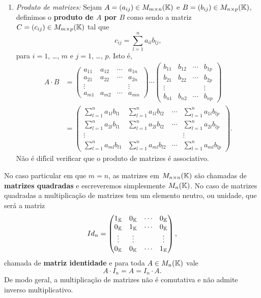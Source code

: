 \begin{enumerate}
	\item \textit{Produto de matrizes:} Sejam $A = (a_{ij}) \in M_{m\times n}(\mathbb{K})$ e $B = (b_{ij}) \in M_{n\times p}(\mathbb{K})$, definimos o \textbf{produto de $A$ por $B$} como sendo a matriz $C = (c_{ij}) \in M_{m\times p}(\mathbb{K})$ tal que
	\[
		c_{ij} = \sum_{l=1}^n a_{il}b_{lj},
	\]
	para $i = 1$, \dots, $m$ e $j = 1$, \dots, $p$. Isto \'e,
	\begin{align*}
		A\cdot B &= \begin{pmatrix}
		a_{11} & a_{12} & \cdots & a_{1n}\\
		a_{21} & a_{22} & \cdots & a_{2n}\\
		\vdots & & & \vdots\\
		a_{m1} & a_{m2} & \cdots & a_{mn}
	\end{pmatrix}\cdots \begin{pmatrix}
		b_{11} & b_{12} & \cdots & b_{1p}\\
		b_{21} & b_{22} & \cdots & b_{2p}\\
		\vdots & & & \vdots\\
		b_{n1} & b_{n2} & \cdots & b_{np}
	\end{pmatrix} \\ &= \begin{pmatrix}
		\sum_{l=1}^n a_{1l}b_{l1} & \sum_{l=1}^n a_{1l}b_{l2} & \cdots & \sum_{l=1}^n a_{1l}b_{lp}\\
		\sum_{l=1}^n a_{2l}b_{l1} & \sum_{l=1}^n a_{2l}b_{l2} & \cdots & \sum_{l=1}^n a_{2l}b_{lp}\\
		\vdots & & & \vdots\\
		\sum_{l=1}^n a_{ml}b_{l1} & \sum_{l=1}^n a_{ml}b_{l2} & \cdots & \sum_{l=1}^n a_{ml}b_{lp}
	\end{pmatrix}.
	\end{align*}
	N\~ao \'e dif{\'\i}cil verificar que o produto de matrizes \'e associativo.
\end{enumerate}

No caso particular em que $m = n$, as matrizes em $M_{n\times n}(\mathbb{K})$ s\~ao chamadas de \textbf{matrizes quadradas} e escreveremos simplesmente $M_n(\mathbb{K})$. No caso de matrizes quadradas a multiplica\c{c}\~ao de matrizes tem um elemento neutro, ou unidade, que ser\'a a matriz
\[
	Id_n = \begin{pmatrix}
		1_{\mathbb{K}} & 0_{\mathbb{K}} & \cdots & 0_{\mathbb{K}}\\
		0_{\mathbb{K}} & 1_{\mathbb{K}} & \cdots & 0_{\mathbb{K}}\\
		\vdots & \vdots & & \vdots\\
		0_{\mathbb{K}} & 0_{\mathbb{K}} & \cdots & 1_{\mathbb{K}}
	\end{pmatrix},
\]
chamada de \textbf{matriz identidade} e para toda $A \in M_n(\mathbb{K})$ vale
\[
	A\cdot I_n = A = I_n\cdot A.
\]
De modo geral, a multiplica\c{c}\~ao de matrizes n\~ao \'e comutativa e n\~ao admite inverso multiplicativo.

